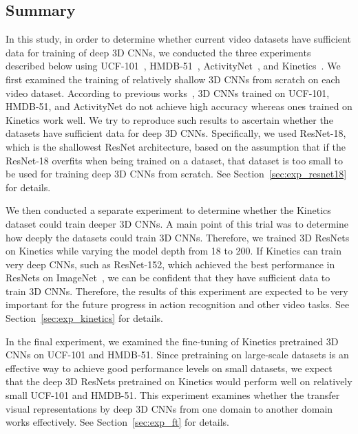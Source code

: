 \documentclass[10pt,twocolumn,letterpaper]{article}
\begin{document}
  \subsection{Summary}
    In this study, in order to determine whether current video datasets have sufficient data for training of deep 3D CNNs,
    we conducted the three experiments described below
    using UCF-101~\cite{UCF101}, HMDB-51~\cite{HMDB51}, ActivityNet~\cite{activitynet}, and Kinetics~\cite{Kinetics}.
    We first examined the training of relatively shallow 3D CNNs from scratch on each video dataset.
    According to previous works~\cite{Hara_2017_ICCV_Workshops,Kinetics},
    3D CNNs trained on UCF-101, HMDB-51, and ActivityNet do not achieve high accuracy
    whereas ones trained on Kinetics work well.
    We try to reproduce such results to ascertain whether the datasets have sufficient data for deep 3D CNNs.
    Specifically, we used ResNet-18, which is the shallowest ResNet architecture,
    based on the assumption that if the ResNet-18 overfits when being trained on a dataset,
    that dataset is too small to be used for training deep 3D CNNs from scratch.
    See Section~\ref{sec:exp_resnet18} for details.

    We then conducted a separate experiment to determine
    whether the Kinetics dataset could train deeper 3D CNNs.
    A main point of this trial was to determine how deeply the datasets could train 3D CNNs.
    Therefore, we trained 3D ResNets on Kinetics while varying the model depth from 18 to 200.
    If Kinetics can train very deep CNNs, such as ResNet-152, which achieved the best performance in ResNets on ImageNet~\cite{ResNet},
    we can be confident that they have sufficient data to train 3D CNNs.
    Therefore, the results of this experiment are expected to be very important for the future progress
    in action recognition and other video tasks.
    See Section~\ref{sec:exp_kinetics} for details.

    In the final experiment, we examined the fine-tuning of Kinetics pretrained 3D CNNs on UCF-101 and HMDB-51.
    Since pretraining on large-scale datasets is an effective way to achieve good performance levels on small datasets,
    we expect that the deep 3D ResNets pretrained on Kinetics would perform well on relatively small UCF-101 and HMDB-51.
    This experiment examines 
    whether the transfer visual representations by deep 3D CNNs from one domain to another domain works effectively.
    See Section~\ref{sec:exp_ft} for details.
\end{document}
